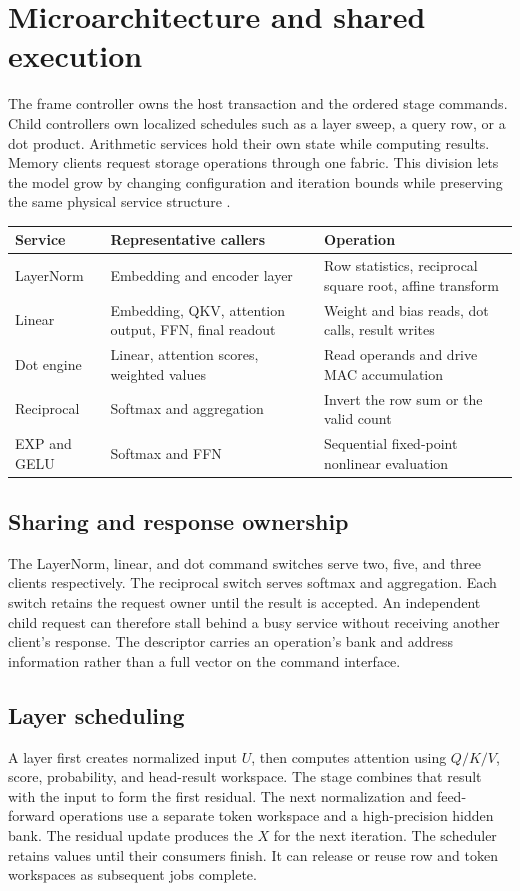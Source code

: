 \section{Microarchitecture and shared execution}
The frame controller owns the host transaction and the ordered stage commands. Child controllers own localized schedules such as a layer sweep, a query row, or a dot product. Arithmetic services hold their own state while computing results. Memory clients request storage operations through one fabric. This division lets the model grow by changing configuration and iteration bounds while preserving the same physical service structure \cite{rtlrepo}.

{\smalltbl
\begin{tabularx}{\linewidth}{@{}P{31mm}YY@{}}
\toprule
Service & Representative callers & Operation\\ \midrule
LayerNorm & Embedding and encoder layer & Row statistics, reciprocal square root, affine transform\\
Linear & Embedding, QKV, attention output, FFN, final readout & Weight and bias reads, dot calls, result writes\\
Dot engine & Linear, attention scores, weighted values & Read operands and drive MAC accumulation\\
Reciprocal & Softmax and aggregation & Invert the row sum or the valid count\\
EXP and GELU & Softmax and FFN & Sequential fixed-point nonlinear evaluation\\
\bottomrule
\end{tabularx}}

\subsection{Sharing and response ownership}
The LayerNorm, linear, and dot command switches serve two, five, and three clients respectively. The reciprocal switch serves softmax and aggregation. Each switch retains the request owner until the result is accepted. An independent child request can therefore stall behind a busy service without receiving another client's response. The descriptor carries an operation's bank and address information rather than a full vector on the command interface.

\subsection{Layer scheduling}
A layer first creates normalized input \(U\), then computes attention using \(Q/K/V\), score, probability, and head-result workspace. The stage combines that result with the input to form the first residual. The next normalization and feed-forward operations use a separate token workspace and a high-precision hidden bank. The residual update produces the \(X\) for the next iteration. The scheduler retains values until their consumers finish. It can release or reuse row and token workspaces as subsequent jobs complete.

